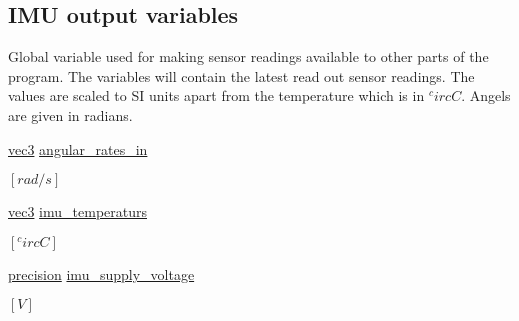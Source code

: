 \subsection*{\-I\-M\-U output variables}
\label{_amgrpbcd3569385d38499cae6e78a31cdccc1}%
 \-Global variable used for making sensor readings available to other parts of the program. \-The variables will contain the latest read out sensor readings. \-The values are scaled to \-S\-I units apart from the temperature which is in $^circ C$. \-Angels are given in radians. \begin{DoxyCompactItemize}
\item 
\hyperlink{nav__types_8h_a90c683614d896321009d3b3c401b764f}{vec3} \hyperlink{group__tables_ga8cac4b2812dcb492989d7122c5eb0bfb}{angular\-\_\-rates\-\_\-in}
\begin{DoxyCompactList}\small\item\em $[rad/s]$ \end{DoxyCompactList}\item 
\hyperlink{nav__types_8h_a90c683614d896321009d3b3c401b764f}{vec3} \hyperlink{group__tables_gacd438fa96131e9024d8ad206d83ffb66}{imu\-\_\-temperaturs}
\begin{DoxyCompactList}\small\item\em $[^circ C]$ \end{DoxyCompactList}\item 
\hyperlink{nav__types_8h_a37e1884b1f06826c49607cec459b4e8a}{precision} \hyperlink{group__tables_ga3f561003deb253bcc716a6c690c87cfe}{imu\-\_\-supply\-\_\-voltage}
\begin{DoxyCompactList}\small\item\em $[V]$ \end{DoxyCompactList}\end{DoxyCompactItemize}

